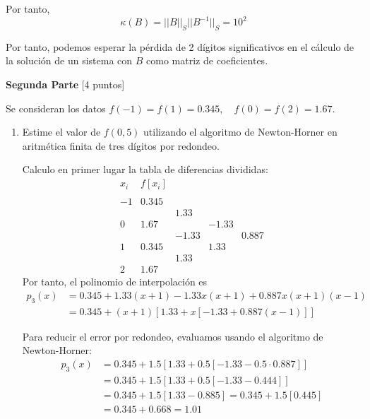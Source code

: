 \documentclass[12pt]{article}
\begin{document}
\begin{ejercicio}
\begin{enumerate}
        Por tanto,
        \begin{equation*}
            \kappa(B) = ||B||_S ||B^{-1}||_S = 10^2
        \end{equation*}

        Por tanto, podemos esperar la pérdida de 2 dígitos significativos en el cálculo de la solución de un sistema con $B$ como matriz de coeficientes.
    \end{enumerate}
\end{ejercicio}

\newpage
\textbf{Segunda Parte} [4 puntos]
\begin{ejercicio}
    Se consideran los datos $f(-1)=f(1)=0.345,\quad f(0)=f(2)=1.67.$
    \begin{enumerate}
        \item Estime el valor de $f(0,5)$ utilizando el algoritmo de Newton-Horner en aritmética finita de tres dígitos por redondeo.

        Calculo en primer lugar la tabla de diferencias divididas:
            \begin{equation*}
                \begin{array}{c|cccc}
                    x_i & f[x_i] \\
                    \\
                    -1 & \mathbf{0.345} \\
                    && \mathbf{1.33}\\
                    0 & 1.67 & & \mathbf{-1.33}\\
                    && -1.33&&\mathbf{0.887}\\
                    1 & 0.345 && 1.33\\
                    & & 1.33\\
                    2 &1.67
                \end{array}
            \end{equation*}
            Por tanto, el polinomio de interpolación es
            \begin{equation*}
                \begin{split}
                    p_3(x) &= 0.345 +1.33(x+1) -1.33x(x+1) +0.887x(x+1)(x-1) \\
                     &= 0.345 +(x+1)[1.33 +x[-1.33 +0.887(x-1)]]
                \end{split}
            \end{equation*}

            Para reducir el error por redondeo, evaluamos usando el algoritmo de Newton-Horner:
            \begin{equation*}\begin{split}
                 p_3(x) & = 0.345 +1.5[1.33+0.5[-1.33-0.5\cdot 0.887]] \\
                & = 0.345 +1.5[1.33+0.5[-1.33-0.444]]\\
                & = 0.345 +1.5[1.33-0.885] =  0.345 +1.5[0.445]\\& = 0.345 + 0.668 = 1.01
            \end{split} \end{equation*}


\end{enumerate}
\end{ejercicio}
\end{document}
